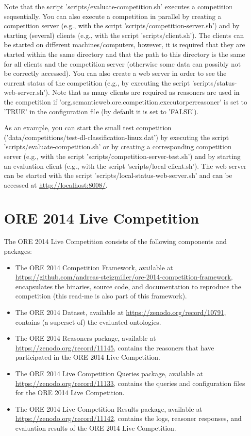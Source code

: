 \documentclass{article}
\begin{document}
Note that the script 'scripts/evaluate-competition.sh' executes a competition sequentially. 
You can also execute a competition in parallel by creating a competition server (e.g., with the script 'scripts/competition-server.sh') and by starting (several) clients (e.g., with the script 'scripts/client.sh').
The clients can be started on different machines/computers, however, it is required that they are started within the same directory and that the path to this directory is the same for all clients and the competition server (otherwise some data can possibly not be correctly accessed).
You can also create a web server in order to see the current status of the competition (e.g., by executing the script 'scripts/status-web-server.sh').
Note that as many clients are required as reasoners are used in the competition if 'org.semanticweb.ore.competition.executorperreasoner' is set to 'TRUE' in the configuration file (by default it is set to 'FALSE').

As an example, you can start the small test competition ('data/competitions/test-dl-classification-linux.dat') by executing the script 'scripts/evaluate-competition.sh' or by creating a corresponding competition server (e.g., with the script 'scripts/competition-server-test.sh') and by starting an evaluation client (e.g., with the script 'scripts/local-client.sh').
The web server can be started with the script 'scripts/local-status-web-server.sh' and can be accessed at \url{http://localhost:8008/}.


\section{ORE 2014 Live Competition}


The ORE 2014 Live Competition consists of the following components and packages:
\begin{itemize}
\item The ORE 2014 Competition Framework, available at \url{https://github.com/andreas-steigmiller/ore-2014-competition-framework}, encapsulates the binaries, source code, and documentation to reproduce the competition (this read-me is also part of this framework).
\item The ORE 2014 Dataset, available at \url{https://zenodo.org/record/10791}, contains (a superset of) the evaluated ontologies.
\item The ORE 2014 Reasoners package, available at \url{https://zenodo.org/record/11145}, contains the reasoners that have participated in the ORE 2014 Live Competition.
\item The ORE 2014 Live Competition Queries package, available at \url{https://zenodo.org/record/11133}, contains the queries and configuration files for the ORE 2014 Live Competition.
\item The ORE 2014 Live Competition Results package, available at \url{https://zenodo.org/record/11142}, contains the logs, reasoner responses, and evaluation results of the ORE 2014 Live Competition.
\end{itemize}
\end{document}
